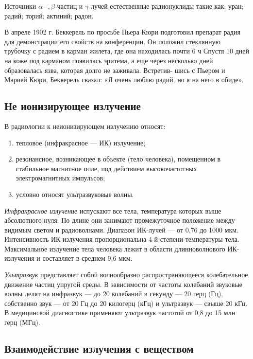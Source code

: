 \documentclass[14pt,a4paper]{article}
\begin{document}
Источники $\alpha-, \beta$-частиц и $\gamma$-лучей естественные радионуклиды такие как: уран; радий; торий;  актиний; радон.

\begin{displayquote}
    В апреле 1902 г. Беккерель по просьбе Пьера Кюри подготовил препарат радия для демонстрации его свойств на конференции. Он положил
    стеклянную трубочку с радием в карман жилета, где она находилась почти
    6 ч Спустя 10 дней на коже под карманом появилась эритема, а еще через
    несколько дней образовалась язва, которая долго не заживала. Встретив-
    шись с Пьером и Марией Кюри, Беккерель сказал: «Я очень люблю радий,
    но я на него в обиде».
\end{displayquote}

\subsection{Не ионизирующее излучение}
В радиологии к неионизирующем излучению относят:
\begin{enumerate}
    \item тепловое (инфракрасное — ИК) излучение;
    \item резонансное, возникающее в объекте (тело
    человека), помещенном в стабильное магнитное поле, под действием высокочастотных электромагнитных импульсов;
    \item условно относят ультразвуковые волны.
\end{enumerate}
\emph{Инфракрасное излучение} испускают все тела, температура которых выше абсолютного нуля. По длине они занимают промежуточное
положение между видимым светом и радиоволнами. Диапазон ИК-лучей —
от 0,76 до 1000 мкм. Интенсивность ИК-излучения пропорциональна 4-й степени температуры тела. Максимальное
излучение тела человека лежит в области длинноволнового ИК-излучения и составляет в среднем 9,6 мкм. 

\emph{Ультразвук} представляет собой волнообразно распространяющееся колебательное движение частиц упругой среды. В зависимости от частоты колебаний звуковые волны делят на инфразвук — до 20 колебаний в секунду — 20 герц (Гц), собственно звук — от 20 Гц до 20 килогерц (кГц) и ультразвук — свыше 20 кГц. В медицинской диагностике применяют ультразвук
частотой от 0,8 до 15 млн герц (МГц).

\subsection{Взаимодействие излучения с веществом}
\end{document}
